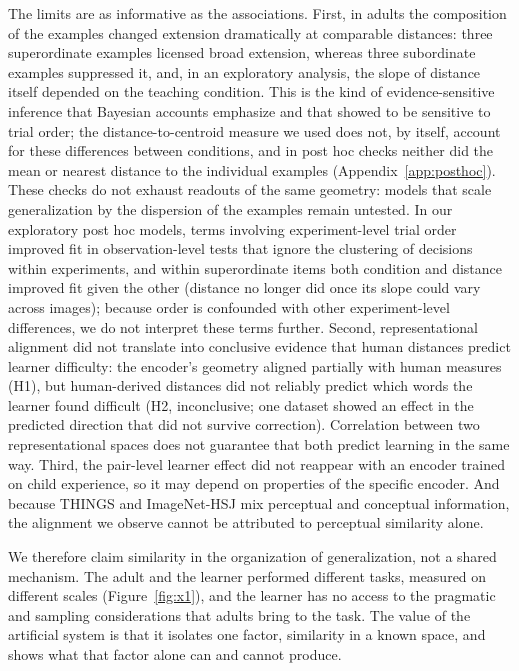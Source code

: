 \documentclass[11pt]{article}
\begin{document}
The limits are as informative as the associations. First, in adults the composition of the examples changed extension dramatically at comparable distances: three superordinate examples licensed broad extension, whereas three subordinate examples suppressed it, and, in an exploratory analysis, the slope of distance itself depended on the teaching condition. This is the kind of evidence-sensitive inference that Bayesian accounts emphasize \parencite{xu2007} and that \textcite{lewis2018} showed to be sensitive to trial order; the distance-to-centroid measure we used does not, by itself, account for these differences between conditions, and in post hoc checks neither did the mean or nearest distance to the individual examples (Appendix~\ref{app:posthoc}). These checks do not exhaust readouts of the same geometry: models that scale generalization by the dispersion of the examples \parencite{tenenbaum2001} remain untested. In our exploratory post hoc models, terms involving experiment-level trial order improved fit in observation-level tests that ignore the clustering of decisions within experiments, and within superordinate items both condition and distance improved fit given the other (distance no longer did once its slope could vary across images); because order is confounded with other experiment-level differences, we do not interpret these terms further. Second, representational alignment did not translate into conclusive evidence that human distances predict learner difficulty: the encoder's geometry aligned partially with human measures (H1), but human-derived distances did not reliably predict which words the learner found difficult (H2, inconclusive; one dataset showed an effect in the predicted direction that did not survive correction). Correlation between two representational spaces does not guarantee that both predict learning in the same way. Third, the pair-level learner effect did not reappear with an encoder trained on child experience, so it may depend on properties of the specific encoder. And because THINGS and ImageNet-HSJ mix perceptual and conceptual information, the alignment we observe cannot be attributed to perceptual similarity alone.

We therefore claim similarity in the organization of generalization, not a shared mechanism. The adult and the learner performed different tasks, measured on different scales (Figure~\ref{fig:x1}), and the learner has no access to the pragmatic and sampling considerations that adults bring to the task. The value of the artificial system is that it isolates one factor, similarity in a known space, and shows what that factor alone can and cannot produce.
\end{document}
